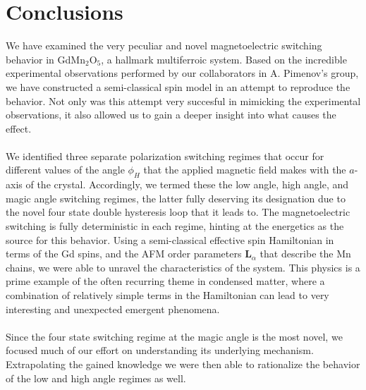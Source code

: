 \section{Conclusions}
We have examined the very peculiar and novel magnetoelectric switching behavior in GdMn$_2$O$_5$, a hallmark multiferroic system.
Based on the incredible experimental observations performed by our collaborators in A. Pimenov's group, we have constructed a semi-classical spin model in an attempt to reproduce the behavior.
Not only was this attempt very succesful in mimicking the experimental observations, it also allowed us to gain a deeper insight into what causes the effect.
\\\\
We identified three separate polarization switching regimes that occur for different values of the angle $\phi_H$ that the applied magnetic field makes with the $a$-axis of the crystal.
Accordingly, we termed these the low angle, high angle, and magic angle switching regimes, the latter fully deserving its designation due to the novel four state double hysteresis loop that it leads to.
The magnetoelectric switching is fully deterministic in each regime, hinting at the energetics as the source for this behavior.
Using a semi-classical effective spin Hamiltonian in terms of the Gd spins, and the AFM order parameters $\bm L_\alpha$ that describe the Mn chains, we were able to unravel the characteristics of the system.
This physics is a prime example of the often recurring theme in condensed matter, where a combination of relatively simple terms in the Hamiltonian can lead to very interesting and unexpected emergent phenomena.
\\\\
Since the four state switching regime at the magic angle is the most novel, we focused much of our effort on understanding its underlying mechanism. Extrapolating the gained knowledge we were then able to rationalize the behavior of the low and high angle regimes as well.

